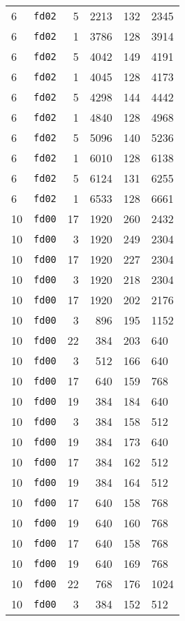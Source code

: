 \documentclass{article}
\begin{document}
\begin{table}[h!]
\begin{tabular}{llrrrl}
    6 & \texttt{fd02} & 5 & 2213 & 132 & 2345 \\
    6 & \texttt{fd02} & 1 & 3786 & 128 & 3914 \\
    6 & \texttt{fd02} & 5 & 4042 & 149 & 4191 \\
    6 & \texttt{fd02} & 1 & 4045 & 128 & 4173 \\
    6 & \texttt{fd02} & 5 & 4298 & 144 & 4442 \\
    6 & \texttt{fd02} & 1 & 4840 & 128 & 4968 \\
    6 & \texttt{fd02} & 5 & 5096 & 140 & 5236 \\
    6 & \texttt{fd02} & 1 & 6010 & 128 & 6138 \\
    6 & \texttt{fd02} & 5 & 6124 & 131 & 6255 \\
    6 & \texttt{fd02} & 1 & 6533 & 128 & 6661 \\
    10 & \texttt{fd00} & 17 & 1920 & 260 & 2432 \\
    10 & \texttt{fd00} & 3 & 1920 & 249 & 2304 \\
    10 & \texttt{fd00} & 17 & 1920 & 227 & 2304 \\
    10 & \texttt{fd00} & 3 & 1920 & 218 & 2304 \\
    10 & \texttt{fd00} & 17 & 1920 & 202 & 2176 \\
    10 & \texttt{fd00} & 3 & 896 & 195 & 1152 \\
    10 & \texttt{fd00} & 22 & 384 & 203 & 640 \\
    10 & \texttt{fd00} & 3 & 512 & 166 & 640 \\
    10 & \texttt{fd00} & 17 & 640 & 159 & 768 \\
    10 & \texttt{fd00} & 19 & 384 & 184 & 640 \\
    10 & \texttt{fd00} & 3 & 384 & 158 & 512 \\
    10 & \texttt{fd00} & 19 & 384 & 173 & 640 \\
    10 & \texttt{fd00} & 17 & 384 & 162 & 512 \\
    10 & \texttt{fd00} & 19 & 384 & 164 & 512 \\
    10 & \texttt{fd00} & 17 & 640 & 158 & 768 \\
    10 & \texttt{fd00} & 19 & 640 & 160 & 768 \\
    10 & \texttt{fd00} & 17 & 640 & 158 & 768 \\
    10 & \texttt{fd00} & 19 & 640 & 169 & 768 \\
    10 & \texttt{fd00} & 22 & 768 & 176 & 1024 \\
    10 & \texttt{fd00} & 3 & 384 & 152 & 512 \\

\end{tabular}
\end{table}
\end{document}
